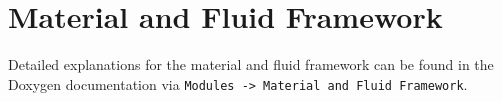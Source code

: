 \section{Material and Fluid Framework}
\label{sec:fluidframework}

Detailed explanations for the \Dumux material and fluid framework can be found in the Doxygen documentation via \texttt{Modules -> Material and Fluid Framework}.


